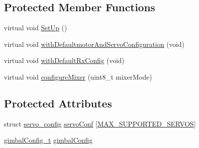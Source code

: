 \subsection*{Protected Member Functions}
\begin{DoxyCompactItemize}
\item 
virtual void \hyperlink{classBasicMixerIntegrationTest_a0393ea4e3d531345d69de42396982fa7}{Set\+Up} ()
\item 
virtual void \hyperlink{classBasicMixerIntegrationTest_a4cd5ffbf399c5b93a087797757e2392f}{with\+Defaultmotor\+And\+Servo\+Configuration} (void)
\item 
virtual void \hyperlink{classBasicMixerIntegrationTest_a671008fd48c8b20a19d022cafe7691ef}{with\+Default\+Rx\+Config} (void)
\item 
virtual void \hyperlink{classBasicMixerIntegrationTest_aa0e4eefbcc0101277cf67075deb42857}{configure\+Mixer} (uint8\+\_\+t mixer\+Mode)
\end{DoxyCompactItemize}
\subsection*{Protected Attributes}
\begin{DoxyCompactItemize}
\item 
struct \hyperlink{structservo__config}{servo\+\_\+config} \hyperlink{classBasicMixerIntegrationTest_a69cedae3d3b6dabc8edb8da44c5e3317}{servo\+Conf} \mbox{[}\hyperlink{config_2mixer_8h_ada6fb418c359e00906599a7f6ac6c92d}{M\+A\+X\+\_\+\+S\+U\+P\+P\+O\+R\+T\+E\+D\+\_\+\+S\+E\+R\+V\+O\+S}\mbox{]}
\item 
\hyperlink{gimbal_8h_a5f6fe26a30f439c0fa7d43b7d5bd3b70}{gimbal\+Config\+\_\+t} \hyperlink{classBasicMixerIntegrationTest_ae7a4a47c5446b70da61616045ef4d6d5}{gimbal\+Config}
\end{DoxyCompactItemize}


